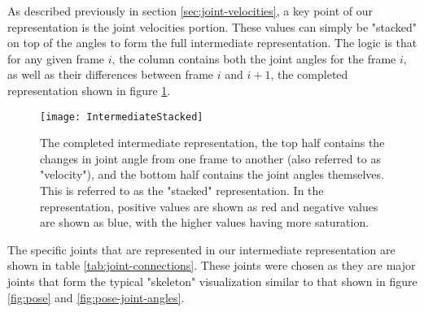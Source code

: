 As described previously in section \ref{sec:joint-velocities}, a key point of our representation is the joint velocities portion. These values can simply be "stacked" on top of the angles to form the full intermediate representation. The logic is that for any given frame $i$, the column contains both the joint angles for the frame $i$, as well as their differences between frame $i$ and $i+1$, the completed representation shown in figure \ref{fig:intermediate-stacked}.

\begin{figure}[ht]
	\texttt{[image: IntermediateStacked]}
	\centering
	\caption{The completed intermediate representation, the top half contains the changes in joint angle from one frame to another (also referred to as "velocity"), and the bottom half contains the joint angles themselves. This is referred to as the "stacked" representation. In the representation, positive values are shown as red and negative values are shown as blue, with the higher values having more saturation.}
	\label{fig:intermediate-stacked}
\end{figure}

The specific joints that are represented in our intermediate representation are shown in table \ref{tab:joint-connections}. These joints were chosen as they are major joints that form the typical "skeleton" visualization similar to that shown in figure \ref{fig:pose} and \ref{fig:pose-joint-angles}.

